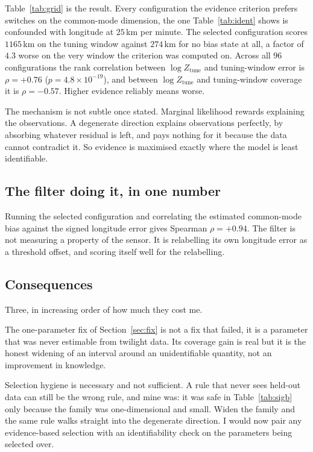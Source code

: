 \documentclass[conference]{IEEEtran}
\begin{document}
Table~\ref{tab:grid} is the result. Every configuration the evidence criterion
prefers switches on the common-mode dimension, the one Table~\ref{tab:ident} shows
is confounded with longitude at $25$\,\si{\km} per minute. The selected
configuration scores $1165$\,\si{\km} on the tuning window against $274$\,\si{\km}
for no bias state at all, a factor of $4.3$ worse on the very window the criterion
was computed on. Across all $96$ configurations the rank correlation between
$\log Z_\text{tune}$ and tuning-window error is $\rho = +0.76$
($p = 4.8 \times 10^{-19}$), and between $\log Z_\text{tune}$ and tuning-window
coverage it is $\rho = -0.57$. Higher evidence reliably means worse.

The mechanism is not subtle once stated. Marginal likelihood rewards explaining the
observations. A degenerate direction explains observations perfectly, by absorbing
whatever residual is left, and pays nothing for it because the data cannot
contradict it. So evidence is maximised exactly where the model is least
identifiable.

\subsection{The filter doing it, in one number}
Running the selected configuration and correlating the estimated common-mode bias
against the signed longitude error gives Spearman $\rho = +0.94$. The filter is not
measuring a property of the sensor. It is relabelling its own longitude error as a
threshold offset, and scoring itself well for the relabelling.

\subsection{Consequences}
Three, in increasing order of how much they cost me.

The one-parameter fix of Section~\ref{sec:fix} is not a fix that failed, it is a
parameter that was never estimable from twilight data. Its coverage gain is real
but it is the honest widening of an interval around an unidentifiable quantity, not
an improvement in knowledge.

Selection hygiene is necessary and not sufficient. A rule that never sees held-out
data can still be the wrong rule, and mine was: it was safe in
Table~\ref{tab:sigb} only because the family was one-dimensional and small. Widen
the family and the same rule walks straight into the degenerate direction. I would
now pair any evidence-based selection with an identifiability check on the
parameters being selected over.
\end{document}
